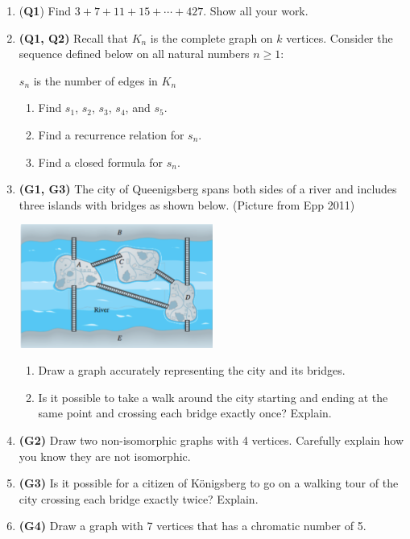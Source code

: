 \documentclass[12pt]{article}
\begin{document}
\begin{enumerate}
\item (\textbf{Q1}) Find $3 + 7 + 11 + 15 + \cdots + 427$. Show all your work.

\item \textbf{(Q1, Q2)} Recall that $K_{n}$ is the complete graph on $k$ vertices. Consider the sequence defined below on all natural numbers $n \geq 1$:
\begin{center}
$s_{n}$ is the number of edges in $K_{n}$
\end{center}

\begin{enumerate}
    \item Find $s_{1}$, $s_{2}$, $s_{3}$, $s_{4}$, and $s_{5}$.
    \item Find a recurrence relation for $s_{n}$.
    \item Find a closed formula for $s_{n}$.
\end{enumerate}

\item \textbf{(G1, G3)} The city of Queenigsberg spans both sides of a river and includes three islands with bridges as shown below. (Picture from Epp 2011)

\begin{center}
\includegraphics[width=0.5\textwidth]{bridge_picture.png}
\end{center}

\begin{enumerate}
    \item Draw a graph accurately representing the city and its bridges.
    \item Is it possible to take a walk around the city starting and ending at the same point and crossing each bridge exactly once? Explain.
\end{enumerate}

\item \textbf{(G2)} Draw two non-isomorphic graphs with 4 vertices. Carefully explain how you know they are not isomorphic.

\item \textbf{(G3)} Is it possible for a citizen of  K\"{o}nigsberg to go on a walking tour of the city crossing each bridge exactly twice? Explain.

\item \textbf{(G4)} Draw a graph with 7 vertices that has a chromatic number of 5.

\end{enumerate}
\end{document}
